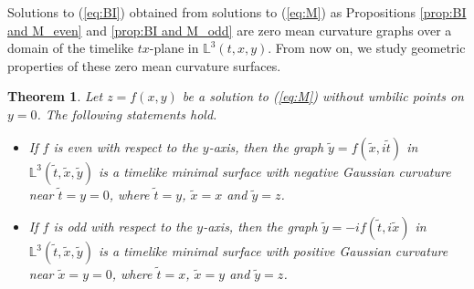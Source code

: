 \documentclass[12pt,amstex]{amsart}%
\theoremstyle{plain} %
\newtheorem{theorem}{Theorem}[section]
\theoremstyle{definition}
\begin{document}
Solutions to (\ref{eq:BI}) obtained from solutions to (\ref{eq:M}) as Propositions \ref{prop:BI and M_even} and \ref{prop:BI and M_odd} are zero mean curvature graphs over a domain of the timelike $tx$-plane in $\mathbb{L}^3(t,x,y)$. From now on, we study geometric properties of these zero mean curvature surfaces.
\begin{theorem}\label{thm:BI and M}
Let $z=f(x,y)$ be a solution to (\ref{eq:M}) without umbilic points on $y=0$. The following statements hold.
\begin{itemize}
\item[(i)] If $f$ is even with respect to the $y$-axis, then the graph $\tilde{y}=f(\tilde{x},i\tilde{t})$ in $\mathbb{L}^3(\tilde{t},\tilde{x},\tilde{y})$ is a timelike minimal surface with negative Gaussian curvature near $\tilde{t}=y=0$, where $\tilde{t}=y$, $\tilde{x}=x$ and $\tilde{y}=z$.
\item[(ii)]If $f$ is odd with respect to the $y$-axis, then the graph $\tilde{y}=-if(\tilde{t},i\tilde{x})$ in $\mathbb{L}^3(\tilde{t},\tilde{x},\tilde{y})$ is a timelike minimal surface with positive Gaussian curvature near $\tilde{x}=y=0$, where $\tilde{t}=x$, $\tilde{x}=y$ and $\tilde{y}=z$.
\end{itemize}
\end{theorem}
\end{document}
